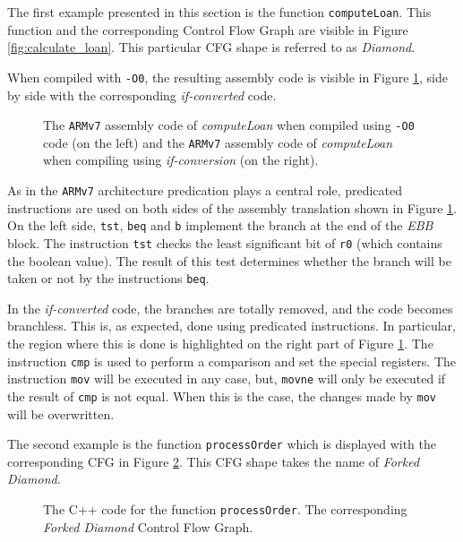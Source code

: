 The first example presented in this section is the function \texttt{computeLoan}. This function and the corresponding Control Flow Graph are visible in Figure \ref{fig:calculate_loan}. This particular CFG shape is referred to as \textit{Diamond}.

When compiled with \texttt{-O0}, the resulting assembly code is visible in Figure \ref{fig:calculate_loan_asm}, side by side with the corresponding \textit{if-converted} code.

\begin{figure}[H]
    \centering
    
    \caption[\texttt{ARMv7} Assembly Code of \textit{computeLoan}]{The \texttt{ARMv7} assembly code of \textit{computeLoan} when compiled using \texttt{-O0} code (on the left) and the \texttt{ARMv7} assembly code of \textit{computeLoan} when compiling using \textit{if-conversion} (on the right).}
    \label{fig:calculate_loan_asm}
\end{figure}

\newpage

As in the \texttt{ARMv7} architecture predication plays a central role, predicated instructions are used on both sides of the assembly translation shown in Figure \ref{fig:calculate_loan_asm}. On the left side, \texttt{tst}, \texttt{beq} and \texttt{b} implement the branch at the end of the \textit{EBB} block.
The instruction \texttt{tst} checks the least significant bit of \texttt{r0} (which contains the boolean value). The result of this test determines whether the branch will be taken or not by the instructions \texttt{beq}.

In the \textit{if-converted} code, the branches are totally removed, and the code becomes branchless. This is, as expected, done using predicated instructions. In particular, the region where this is done is highlighted on the right part of Figure \ref{fig:calculate_loan_asm}.
The instruction \texttt{cmp} is used to perform a comparison and set the special registers. The instruction \texttt{mov} will be executed in any case, but, \texttt{movne} will only be executed if the result of \texttt{cmp} is not equal. When this is the case, the changes made by \texttt{mov} will be overwritten.

The second example is the function \texttt{processOrder} which is displayed with the corresponding CFG in Figure \ref{fig:processOrder}. This CFG shape takes the name of \textit{Forked Diamond}.

\begin{figure}[H]
    \centering
    
    \caption[Process Order Code and \textit{Forked Diamond}]{The C++ code for the function \texttt{processOrder}. The corresponding \textit{Forked Diamond} Control Flow Graph.}
    \label{fig:processOrder}
\end{figure}

